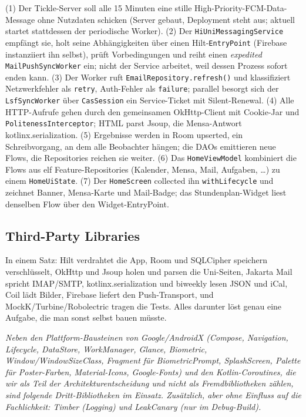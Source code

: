 \documentclass{msereport}
\begin{document}
\begin{itemize}
        (1) Der Tickle-Server soll alle 15 Minuten eine stille
        High-Priority-FCM-Data-Message ohne Nutzdaten schicken (Server gebaut,
        Deployment steht aus; aktuell startet stattdessen der periodische Worker).
        (2) Der \texttt{HiUniMessagingService} empfängt sie, holt seine
        Abhängigkeiten über einen Hilt-\texttt{EntryPoint} (Firebase instanziiert
        ihn selbst), prüft Vorbedingungen und reiht einen \emph{expedited}
        \texttt{MailPushSyncWorker} ein; nicht der Service arbeitet, weil dessen
        Prozess sofort enden kann. (3) Der Worker ruft
        \texttt{EmailRepository.refresh()} und klassifiziert Netzwerkfehler als
        \texttt{retry}, Auth-Fehler als \texttt{failure}; parallel besorgt sich
        der \texttt{LsfSyncWorker} über \texttt{CasSession} ein Service-Ticket
        mit Silent-Renewal. (4) Alle HTTP-Aufrufe gehen durch den gemeinsamen
        OkHttp-Client mit Cookie-Jar und \texttt{PolitenessInterceptor}; HTML
        parst Jsoup, die Mensa-Antwort kotlinx.serialization. (5) Ergebnisse
        werden in Room upserted, ein Schreibvorgang, an dem alle Beobachter
        hängen; die DAOs emittieren neue Flows, die Repositories reichen sie
        weiter. (6) Das \texttt{HomeViewModel} kombiniert die Flows aus elf
        Feature-Repositories (Kalender, Mensa, Mail, Aufgaben, \dots) zu einem
        \texttt{HomeUiState}. (7) Der \texttt{HomeScreen} collected ihn
        \texttt{withLifecycle} und zeichnet Banner, Mensa-Karte und Mail-Badge;
        das Stundenplan-Widget liest denselben Flow über den Widget-EntryPoint.
\end{itemize}

\subsection{Third-Party Libraries}

In einem Satz: Hilt verdrahtet die App, Room und SQLCipher speichern
verschlüsselt, OkHttp und Jsoup holen und parsen die Uni-Seiten, Jakarta Mail
spricht IMAP/SMTP, kotlinx.serialization und biweekly lesen JSON und iCal, Coil
lädt Bilder, Firebase liefert den Push-Transport, und MockK/Turbine/Robolectric
tragen die Tests. Alles darunter löst genau eine Aufgabe, die man sonst selbst
bauen müsste.
\par\vspace{6pt}

{\itshape Neben den Plattform-Bausteinen von Google/AndroidX (Compose,
Navigation, Lifecycle, DataStore, WorkManager, Glance, Biometric, Window/WindowSizeClass,
Fragment für BiometricPrompt, SplashScreen, Palette für Poster-Farben, Material-Icons,
Google-Fonts) und den Kotlin-Coroutines, die wir als Teil der Architekturentscheidung
und nicht als Fremdbibliotheken zählen, sind folgende Dritt-Bibliotheken im Einsatz.
Zusätzlich, aber ohne Einfluss auf die Fachlichkeit: Timber (Logging) und LeakCanary
(nur im Debug-Build).\par}
\vspace{6pt}
\end{document}
